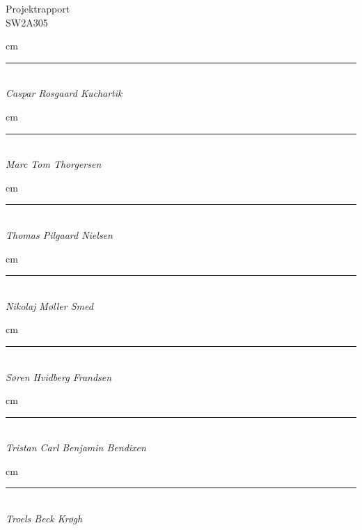   \begin{center}
    {\large
      Projektrapport%
    }\\
    \vspace{0.2cm}
    {\Large
      SW2A305%
    }
		\vspace{2 cm}
		\begin{flushleft}
			 cm
			\Large
      \begin{minipage}{0.45\textwidth}
      \centering
      \rule{\textwidth}{0.5pt}\\
			\textit{Caspar Rosgaard Kuchartik}
      \end{minipage}
		\end{flushleft}
		\begin{flushright}
			\hangindent=2 cm
			\Large
      \begin{minipage}{0.45\textwidth}
      \centering
      \rule{\textwidth}{0.5pt}\\
			\textit{Marc Tom Thorgersen}
		  \end{minipage}
    \end{flushright}
		\begin{flushleft}
			\parindent=2 cm
			\Large
      \begin{minipage}{0.45\textwidth}
      \centering
      \rule{\textwidth}{0.5pt}\\
			\textit{Thomas Pilgaard Nielsen}
		  \end{minipage}
    \end{flushleft}
		\begin{flushright}
			 cm
			\Large
      \begin{minipage}{0.45\textwidth}
      \centering
      \rule{\textwidth}{0.5pt}\\
			\textit{Nikolaj Møller Smed}
		  \end{minipage}
    \end{flushright}
		\begin{flushleft}
			\hangindent=2 cm
			\Large
      \begin{minipage}{0.45\textwidth}
      \centering
      \rule{\textwidth}{0.5pt}\\
			\textit{Søren Hvidberg Frandsen}
		  \end{minipage}
    \end{flushleft}
		\begin{flushright}
			\hangindent=2 cm
			\Large
      \begin{minipage}{0.45\textwidth}
      \centering
      \rule{\textwidth}{0.5pt}\\
			\textit{Tristan Carl Benjamin Bendixen}
		  \end{minipage}
    \end{flushright}
		\begin{flushleft}
			 cm
			\Large
      \begin{minipage}{0.45\textwidth}
      \centering
      \rule{\textwidth}{0.5pt}\\
			\textit{Troels Beck Krøgh}
		  \end{minipage}
    \end{flushleft}

  \end{center}
